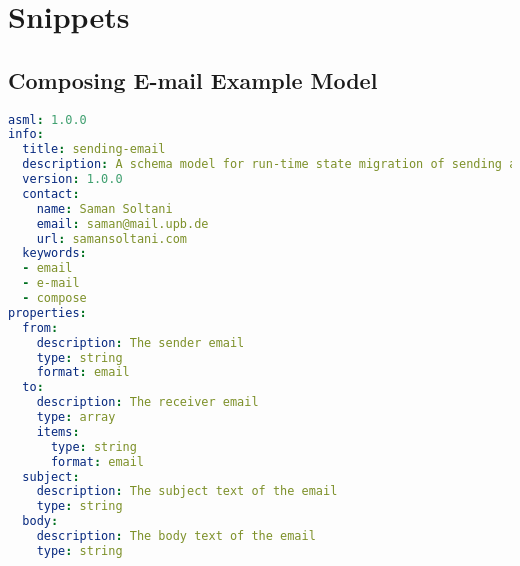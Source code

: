 \chapter{Snippets} 

\label{appendix:compose-email-schema}
\section{Composing E-mail Example Model}
\lstset{
  label=lis:sending-email-schema, caption=Composing E-mail model as JSON Schema in YAML.,
  breaklines=true
}
\begin{lstlisting}[language=yaml]
asml: 1.0.0
info:
  title: sending-email
  description: A schema model for run-time state migration of sending an email
  version: 1.0.0
  contact:
    name: Saman Soltani
    email: saman@mail.upb.de
    url: samansoltani.com
  keywords:
  - email
  - e-mail
  - compose    
properties:
  from:
    description: The sender email
    type: string
    format: email
  to:
    description: The receiver email
    type: array
    items:
      type: string
      format: email
  subject:
    description: The subject text of the email
    type: string
  body:
    description: The body text of the email
    type: string
\end{lstlisting}

